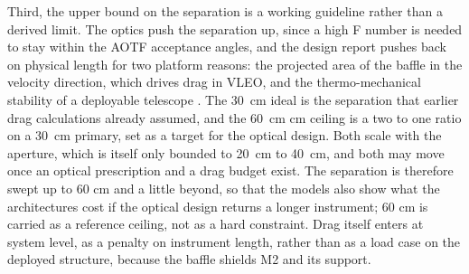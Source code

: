 Third, the upper bound on the separation is a working guideline rather than a derived limit. The optics push the separation up, since a high F number is needed to stay within the AOTF acceptance angles, and the design report pushes back on physical length for two platform reasons: the projected area of the baffle in the velocity direction, which drives drag in VLEO, and the thermo-mechanical stability of a deployable telescope \cite{bouwmeester_plasmo_2026}. The \SI{30}{\centi\meter} ideal is the separation that earlier drag calculations already assumed, and the \SI{60}{\centi\meter} cm ceiling is a two to one ratio on a \SI{30}{\centi\meter} primary, set as a target for the optical design. Both scale with the aperture, which is itself only bounded to \SI{20}{\centi\meter} to \SI{40}{\centi\meter}, and both may move once an optical prescription and a drag budget exist. The separation is therefore swept up to 60 cm and a little beyond, so that the models also show what the architectures cost if the optical design returns a longer instrument; 60 cm is carried as a reference ceiling, not as a hard constraint. Drag itself enters at system level, as a penalty on instrument length, rather than as a load case on the deployed structure, because the baffle shields M2 and its support.